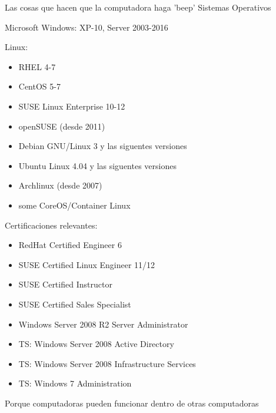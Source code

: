 

\begin{cventries}
  \cventry
    {Las cosas que hacen que la computadora haga 'beep'}
    {Sistemas Operativos}
		{}
    {}
    {
			\begin{cvitems}
				\item Microsoft Windows: XP-10, Server 2003-2016
				\item Linux:
          \begin{itemize}
            \item RHEL 4-7
            \item CentOS 5-7
            \item SUSE Linux Enterprise 10-12
            \item openSUSE (desde 2011)
            \item Debian GNU/Linux 3 y las siguentes versiones
            \item Ubuntu Linux 4.04 y las siguentes versiones
            \item Archlinux (desde 2007)
            \item some CoreOS/Container Linux
          \end{itemize}
        \item Certificaciones relevantes:
          \begin{itemize}
            \item RedHat Certified Engineer 6
            \item SUSE Certified Linux Engineer 11/12
            \item SUSE Certified Instructor
            \item SUSE Certified Sales Specialist
            \item Windows Server 2008 R2 Server Administrator
            \item TS: Windows Server 2008 Active Directory
            \item TS: Windows Server 2008 Infrastructure Services
            \item TS: Windows 7 Administration
          \end{itemize}
      \end{cvitems}
    }
  \cventry
    {Porque computadoras pueden funcionar dentro de otras computadoras}

\end{cventries}
